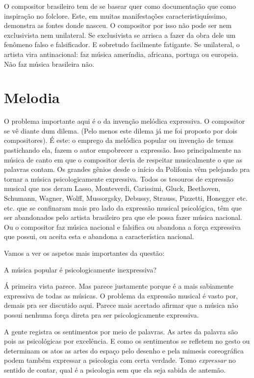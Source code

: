 O compositor brasileiro tem de se basear quer como documentação que como
inspiração no folclore. Este, em muitas manifestações
caracteristiquíssimo, demonstra as fontes donde nasceu. O compositor por
isso não pode ser nem exclusivista nem unilateral. Se exclusivista se
arrisca a fazer da obra dele um fenômeno falso e falsificador. E
sobretudo facilmente fatigante. Se unilateral, o artista vira
antinacional: faz música ameríndia, africana, portuga ou europeia. Não
faz música brasileira não.~

\section{Melodia}

O problema importante aqui é o da invenção melódica expressiva. O
compositor se vê diante dum dilema. (Pelo menos este dilema já me foi
proposto por dois compositores). É este: o emprego da melódica popular
ou invenção de temas pastichando ela, fazem o autor empobrecer a
expressão. Isso principalmente na música de canto em que o compositor
devia de respeitar musicalmente o que as palavras contam. Os grandes
gênios desde o início da Polifonia vêm pelejando pra tornar a música
psicologicamente expressiva. Todos os tesouros de expressão musical que
nos deram Lasso, Monteverdi, Carissimi, Gluck, Beethoven, Schumann,
Wagner, Wolff, Mussorgsky, Debussy, Strauss, Pizzetti, Honegger etc.
etc. que se confinaram mais pro lado da expressão musical psicológica,
têm que ser abandonados pelo artista brasileiro pra que ele possa fazer
música nacional. Ou o compositor faz música nacional e falsifica ou
abandona a força expressiva que possui, ou aceita esta e abandona a
característica nacional.~

Vamos a ver os aspetos mais importantes da questão:~

A música popular é psicologicamente inexpressiva?~

Á primeira vista parece. Mas parece justamente porque é a mais
sabiamente expressiva de todas as músicas. O problema da expressão
musical é vasto por, demais pra ser discutido aqui. Parece mais acertado
afirmar que a música não possui nenhuma força direta pra ser
psicologicamente expressiva.~

A gente registra os sentimentos por meio de palavras. As artes da
palavra são pois as psicológicas por excelência. E como os sentimentos
se refletem no gesto ou determinam os atos as artes do espaço pelo
desenho e pela mimesis coreográfica podem também expressar a psicologia
com certa verdade. Tomo \emph{expressar} no sentido de contar, qual é a
psicologia sem que ela seja sabida de antemão.~

